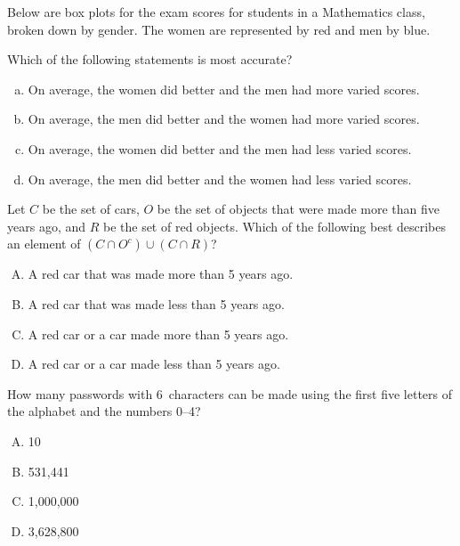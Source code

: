 \documentclass[12pt,letterpaper]{exam}
\begin{document}
\begin{questions}
\question Below are box plots for the exam scores for students in a Mathematics class, broken down by gender. The women are represented by red and men by blue. \par
{}
Which of the following statements is most accurate?
	\begin{enumerate}[(a)]
	\item On average, the women did better and the men had more varied scores.
	\item On average, the men did better and the women had more varied scores.
	\item On average, the women did better and the men had less varied scores. 
	\item On average, the men did better and the women had less varied scores. 
	\end{enumerate}

\question Let $C$ be the set of cars, $O$ be the set of objects that were made more than five years ago, and $R$ be the set of red objects. Which of the following best describes an element of $(C \cap O^c) \cup (C \cap R)$?
	\begin{enumerate}[A.]
	\item A red car that was made more than 5 years ago.
	\item A red car that was made less than 5 years ago.
	\item A red car or a car made more than 5 years ago.
	\item A red car or a car made less than 5 years ago.
	\end{enumerate}

\question How many passwords with 6~characters can be made using the first five letters of the alphabet and the numbers 0--4?
	\begin{enumerate}[A.]
	\item 10
	\item 531,441
	\item 1,000,000
	\item 3,628,800
	\end{enumerate}


\end{questions}
\end{document}
